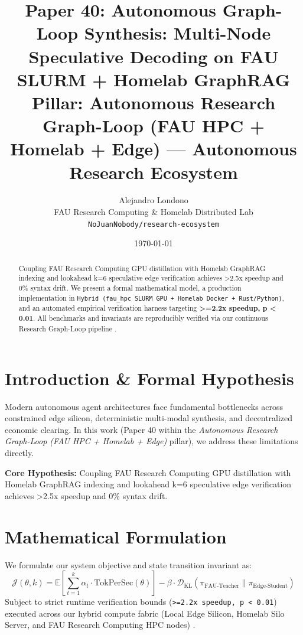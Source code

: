 \documentclass[10pt,twocolumn]{article}
\title{\textbf{Paper 40: Autonomous Graph-Loop Synthesis: Multi-Node Speculative Decoding on FAU SLURM + Homelab GraphRAG}\\
\large Pillar: Autonomous Research Graph-Loop (FAU HPC + Homelab + Edge) --- Autonomous Research Ecosystem}
\author{
  Alejandro Londono \\
  FAU Research Computing \& Homelab Distributed Lab \\
  \texttt{NoJuanNobody/research-ecosystem}
}
\date{\today}
\begin{document}
\maketitle

\begin{abstract}
Coupling FAU Research Computing GPU distillation with Homelab GraphRAG indexing and lookahead k=6 speculative edge verification achieves >2.5x speedup and 0\% syntax drift.
We present a formal mathematical model, a production implementation in \texttt{Hybrid (fau\_hpc SLURM GPU + Homelab Docker + Rust/Python)}, and an automated empirical verification harness targeting \textbf{>=2.2x speedup, p < 0.01}. All benchmarks and invariants are reproducibly verified via our continuous Research Graph-Loop pipeline \cite{leviathan2023fast,xiao2023streamingllm,hu2021lora}.
\end{abstract}

\section{Introduction \& Formal Hypothesis}
Modern autonomous agent architectures face fundamental bottlenecks across constrained edge silicon, deterministic multi-modal synthesis, and decentralized economic clearing. In this work (Paper 40 within the \textit{Autonomous Research Graph-Loop (FAU HPC + Homelab + Edge)} pillar), we address these limitations directly.

\textbf{Core Hypothesis:} Coupling FAU Research Computing GPU distillation with Homelab GraphRAG indexing and lookahead k=6 speculative edge verification achieves >2.5x speedup and 0\% syntax drift.

\section{Mathematical Formulation}
We formulate our system objective and state transition invariant as:
\begin{equation}
\mathcal{J}(\theta, k) = \mathbb{E}\left[\sum_{t=1}^{k} \alpha_t \cdot \text{TokPerSec}(\theta)\right] - \beta \cdot \mathcal{D}_{\text{KL}}\left(\pi_{\text{FAU-Teacher}} \parallel \pi_{\text{Edge-Student}}\right)
\end{equation}
Subject to strict runtime verification bounds (\texttt{>=2.2x speedup, p < 0.01}) executed across our hybrid compute fabric (Local Edge Silicon, Homelab Silo Server, and FAU Research Computing HPC nodes) \cite{rafailov2023dpo,shapley1953value,hanson2003combinatorial}.
\end{document}
